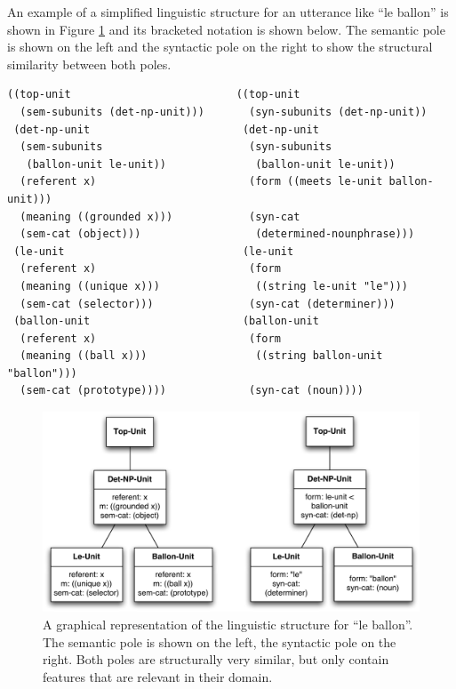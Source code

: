 An example of a simplified linguistic structure for an utterance like
``le ballon'' is shown in Figure \ref{f:cfs-le-ballon} and its
bracketed notation is shown below. The semantic pole is shown on the
left and the syntactic pole on the right to show the structural
similarity between both poles.

\scriptsize
\begin{Verbatim}[frame=lines, label=Example linguistic structure for "le ballon"]
((top-unit                          ((top-unit
  (sem-subunits (det-np-unit)))       (syn-subunits (det-np-unit))
 (det-np-unit                        (det-np-unit
  (sem-subunits                       (syn-subunits 
   (ballon-unit le-unit))              (ballon-unit le-unit))
  (referent x)                        (form ((meets le-unit ballon-unit)))
  (meaning ((grounded x)))            (syn-cat 
  (sem-cat (object)))                  (determined-nounphrase)))
 (le-unit                            (le-unit 
  (referent x)                        (form 
  (meaning ((unique x)))               ((string le-unit "le")))
  (sem-cat (selector)))               (syn-cat (determiner)))
 (ballon-unit                        (ballon-unit 
  (referent x)                        (form 
  (meaning ((ball x)))                 ((string ballon-unit "ballon")))           
  (sem-cat (prototype))))             (syn-cat (noun))))
\end{Verbatim}
\normalsize

\begin{figure}[htbp]
  \begin{center}
    \includegraphics[width=\textwidth]{./frameworks/figures/cfs-le-ballon.pdf}
    \caption[Example coupled feature structure for ``le ballon'']{A
      graphical representation of the linguistic structure for ``le
      ballon''. The semantic pole is shown on the left, the syntactic
      pole on the right. Both poles are structurally very similar, but
      only contain features that are relevant in their domain.}
    \label{f:cfs-le-ballon}
  \end{center}
\end{figure}


